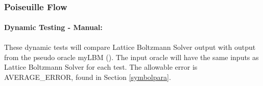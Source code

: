 \documentclass[12pt, titlepage]{article}
\newcommand{\myprogname}{Lattice Boltzmann Solver}
\begin{document}
~\newpage

\subsubsection{Poiseuille Flow}
\label{frpf}

\paragraph{Dynamic Testing - Manual:}
\paragraph{} These dynamic tests will compare {\myprogname} output with output from the pseudo oracle myLBM (\citet{pylbmcode}). The input oracle will have the same inputs as {\myprogname} for each test. The allowable error is AVERAGE\_ERROR, found in Section \ref{symbolpara}.
\end{document}
